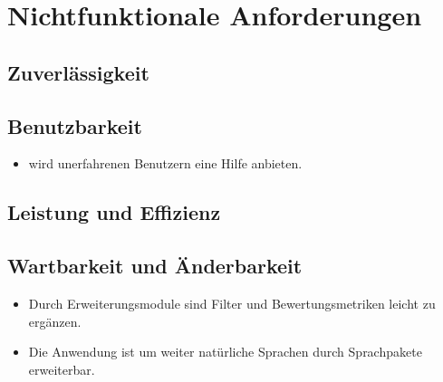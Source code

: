 \chapter{Nichtfunktionale Anforderungen}
\section{Zuverlässigkeit}
\setcounter{counterKriterien}{0}

\section{Benutzbarkeit}
\begin{itemize}
\item \projektTitel wird unerfahrenen Benutzern eine Hilfe anbieten.
\end{itemize}

\section{Leistung und Effizienz}

\section{Wartbarkeit und Änderbarkeit}
\begin{itemize}
\item Durch Erweiterungsmodule sind Filter und Bewertungsmetriken leicht zu ergänzen.
\item Die Anwendung ist um weiter natürliche Sprachen durch Sprachpakete erweiterbar.
\end{itemize}